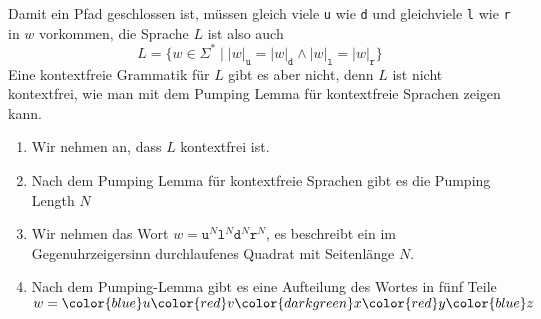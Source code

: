 \begin{loesung}
Damit ein Pfad geschlossen ist, müssen gleich viele 
\texttt{u} wie
\texttt{d} und
gleichviele
\texttt{l} wie \texttt{r} 
in $w$ vorkommen, die Sprache $L$ ist also auch
\begin{equation}
L=\{
w\in\Sigma^*
\mid
|w|_{\texttt{u}} = |w|_{\texttt{d}}
\wedge
|w|_{\texttt{l}} = |w|_{\texttt{r}}
\}
\label{40000073:cond}
\end{equation}
Eine kontextfreie Grammatik für $L$ gibt es aber nicht, denn
$L$ ist nicht kontextfrei, wie man mit dem Pumping Lemma für kontextfreie
Sprachen zeigen kann.

\begin{enumerate}
\item
Wir nehmen an, dass $L$ kontextfrei ist.
\item
Nach dem Pumping Lemma für kontextfreie Sprachen gibt es die
Pumping Length $N$
\item
Wir nehmen das Wort
$w= \texttt{u}^N \texttt{l}^N \texttt{d}^N \texttt{r}^N $,
es beschreibt ein im Gegenuhrzeigersinn durchlaufenes Quadrat mit
Seitenlänge $N$.
\item
Nach dem Pumping-Lemma gibt es eine Aufteilung des Wortes in
fünf Teile
$w=
{\color{blue}u}
{\color{red}v}
{\color{darkgreen}x}
{\color{red}y}
{\color{blue}z}$
\begin{center}
\end{center}
\end{enumerate}
\end{loesung}
